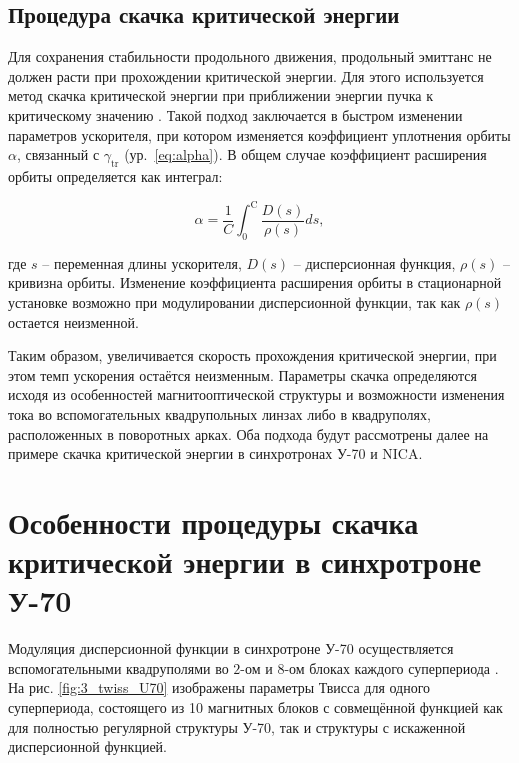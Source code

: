 \newpage
\subsection{Процедура скачка критической энергии}

\par Для сохранения стабильности продольного движения, продольный эмиттанс не должен расти при прохождении критической энергии. Для этого используется метод скачка критической энергии при приближении энергии пучка к критическому значению \cite{risselada:jump}. Такой подход заключается в быстром изменении параметров ускорителя, при котором изменяется коэффициент уплотнения орбиты $\alpha$, связанный с $\gamma_{\textrm{tr}}$ (ур.~\ref{eq:alpha}). В общем случае коэффициент расширения орбиты определяется как интеграл:

\begin{equation}
\alpha=\frac{1}{C} \int_0^{\mathrm{C}} \frac{D(s)}{\rho(s)} d s,
\label{eq:alpha_general}
\end{equation}

\noindent где $s$ -- переменная длины ускорителя, $D\left(s\right)$ -- дисперсионная функция, $\rho\left(s\right)$ -- кривизна орбиты. Изменение коэффициента расширения орбиты в стационарной установке возможно при модулировании дисперсионной функции, так как $\rho\left(s\right)$ остается неизменной. 

\par Таким образом, увеличивается скорость прохождения критической энергии, при этом темп ускорения остаётся неизменным. Параметры скачка определяются исходя из особенностей магнитооптической структуры и возможности изменения тока во вспомогательных квадрупольных линзах либо в квадруполях, расположенных в поворотных арках. Оба подхода будут рассмотрены далее на примере скачка критической энергии в синхротронах У-70 и NICA.

\section{Особенности процедуры скачка критической энергии в синхротроне У-70}

\par Модуляция дисперсионной функции в синхротроне У-70 осуществляется вспомогательными квадруполями во $2$-ом и $8$-ом блоках каждого суперпериода \cite{cherniy:ihep}. На рис. \ref{fig:3_twiss_U70} изображены параметры Твисса для одного суперпериода, состоящего из 10 магнитных блоков с совмещённой функцией как для полностью регулярной структуры У-70, так и структуры с искаженной дисперсионной функцией.

